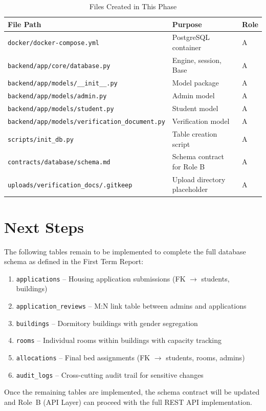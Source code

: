 \documentclass[12pt,a4paper]{article}
\begin{document}
\begin{table}[h!]
\centering
\caption{Files Created in This Phase}
\begin{tabular}{@{}lll@{}}
\toprule
\textbf{File Path}                                     & \textbf{Purpose}                  & \textbf{Role} \\ \midrule
\texttt{docker/docker-compose.yml}                     & PostgreSQL container              & A             \\
\texttt{backend/app/core/database.py}                  & Engine, session, Base             & A             \\
\texttt{backend/app/models/\_\_init\_\_.py}             & Model package                     & A             \\
\texttt{backend/app/models/admin.py}                   & Admin model                       & A             \\
\texttt{backend/app/models/student.py}                 & Student model                     & A             \\
\texttt{backend/app/models/verification\_document.py}  & Verification model                & A             \\
\texttt{scripts/init\_db.py}                           & Table creation script             & A             \\
\texttt{contracts/database/schema.md}                  & Schema contract for Role B        & A             \\
\texttt{uploads/verification\_docs/.gitkeep}           & Upload directory placeholder      & A             \\
\bottomrule
\end{tabular}
\end{table}

\section{Next Steps}

The following tables remain to be implemented to complete the full database schema as defined in the First Term Report:

\begin{enumerate}
    \item \texttt{applications} -- Housing application submissions (FK $\rightarrow$ students, buildings)
    \item \texttt{application\_reviews} -- M:N link table between admins and applications
    \item \texttt{buildings} -- Dormitory buildings with gender segregation
    \item \texttt{rooms} -- Individual rooms within buildings with capacity tracking
    \item \texttt{allocations} -- Final bed assignments (FK $\rightarrow$ students, rooms, admins)
    \item \texttt{audit\_logs} -- Cross-cutting audit trail for sensitive changes
\end{enumerate}

Once the remaining tables are implemented, the schema contract will be updated and Role~B (API Layer) can proceed with the full REST API implementation.
\end{document}
